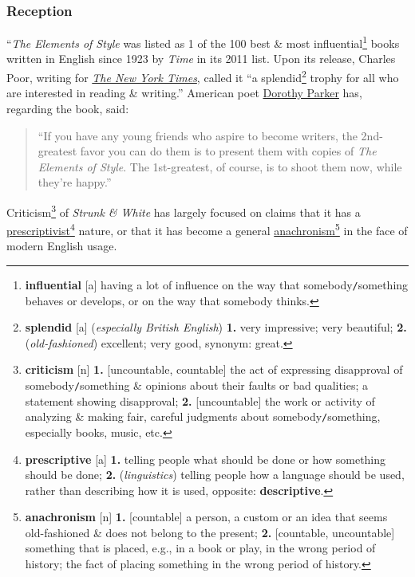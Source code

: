 \documentclass{article}
\begin{document}
\subsubsection{Reception}
``{\it The Elements of Style} was listed as 1 of the 100 best \& most influential\footnote{{\bf influential} [a] having a lot of influence on the way that somebody{\tt/}something behaves or develops, or on the way that somebody thinks.} books written in English since 1923 by {\it Time} in its 2011 list. Upon its release, Charles Poor, writing for \href{https://en.wikipedia.org/wiki/The_New_York_Times}{{\it The New York Times}}, called it ``a splendid\footnote{{\bf splendid} [a] ({\it especially British English}) {\bf 1.} very impressive; very beautiful; {\bf 2.} ({\it old-fashioned}) excellent; very good, {\sc synonym}: great.} trophy for all who are interested in reading \& writing.'' American poet \href{https://en.wikipedia.org/wiki/Dorothy_Parker}{Dorothy Parker} has, regarding the book, said:
\begin{quotation}
	``If you have any young friends who aspire to become writers, the 2nd-greatest favor you can do them is to present them with copies of {\it The Elements of Style}. The 1st-greatest, of course, is to shoot them now, while they're happy.''
\end{quotation}
Criticism\footnote{{\bf criticism} [n] {\bf 1.} [uncountable, countable] the act of expressing disapproval of somebody{\tt/}something \& opinions about their faults or bad qualities; a statement showing disapproval; {\bf 2.} [uncountable] the work or activity of analyzing \& making fair, careful judgments about somebody{\tt/}something, especially books, music, etc.} of {\it Strunk \& White} has largely focused on claims that it has a \href{https://en.wikipedia.org/wiki/Linguistic_prescriptivism}{prescriptivist}\footnote{{\bf prescriptive} [a] {\bf 1.} telling people what should be done or how something should be done; {\bf 2.} ({\it linguistics}) telling people how a language should be used, rather than describing how it is used, {\sc opposite}: {\bf descriptive}.} nature, or that it has become a general \href{https://en.wikipedia.org/wiki/Anachronism}{anachronism}\footnote{{\bf anachronism} [n] {\bf 1.} [countable] a person, a custom or an idea that seems old-fashioned \& does not belong to the present; {\bf 2.} [countable, uncountable] something that is placed, e.g., in a book or play, in the wrong period of history; the fact of placing something in the wrong period of history.} in the face of modern English usage.
\end{document}
